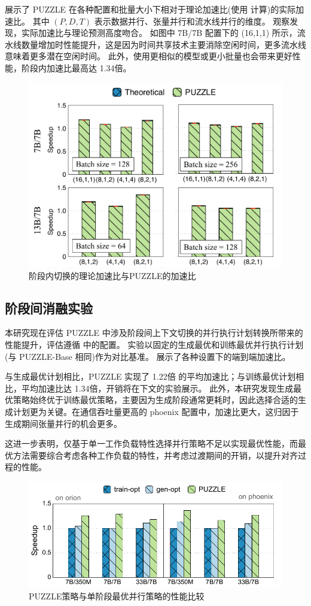  展示了 PUZZLE 在各种配置和批量大小下相对于理论加速比(使用 计算)的实际加速比。
其中 $(P,D,T)$ 表示数据并行、张量并行和流水线并行的维度。
观察发现，实际加速比与理论预测高度吻合。
如图中 7B/7B 配置下的 (16,1,1) 所示，流水线数量增加时性能提升，这是因为时间共享技术主要消除空闲时间，更多流水线意味着更多潜在空闲时间。
此外，使用更相似的模型或更小批量也会带来更好性能，阶段内加速比最高达 1.34倍。  


\begin{figure}[t]
     \centering
     \includegraphics[width=0.65\linewidth]{figures/puzzle/intra-stage-theoreitcal.pdf}
     \caption{阶段内切换的理论加速比与PUZZLE的加速比} 
     \label{fig:intra-stage-theoretical}
\end{figure}

\subsection{阶段间消融实验}  

本研究现在评估 PUZZLE 中涉及阶段间上下文切换的并行执行计划转换所带来的性能提升，评估遵循 中的配置。
实验以固定的生成最优和训练最优并行执行计划(与 PUZZLE-Base 相同)作为对比基准。 展示了各种设置下的端到端加速比。  

与生成最优计划相比，PUZZLE 实现了 1.22倍 的平均加速比；与训练最优计划相比，平均加速比达 1.34倍，开销将在下文的实验展示。
此外，本研究发现生成最优策略始终优于训练最优策略，主要因为生成阶段通常更耗时，因此选择合适的生成计划更为关键。在通信吞吐量更高的 phoenix 配置中，加速比更大，这归因于生成期间张量并行的机会更多。  

这进一步表明，仅基于单一工作负载特性选择并行策略不足以实现最优性能，而最优方法需要综合考虑各种工作负载的特性，并考虑过渡期间的开销，以提升对齐过程的性能。  

\begin{figure}[t]
     \centering
     \includegraphics[width=0.65\linewidth]{figures/puzzle/inter-stage-ablation-study.pdf}
     \caption{PUZZLE策略与单阶段最优并行策略的性能比较} 
     \label{fig:inter-stage-ablation-study}
\end{figure}

